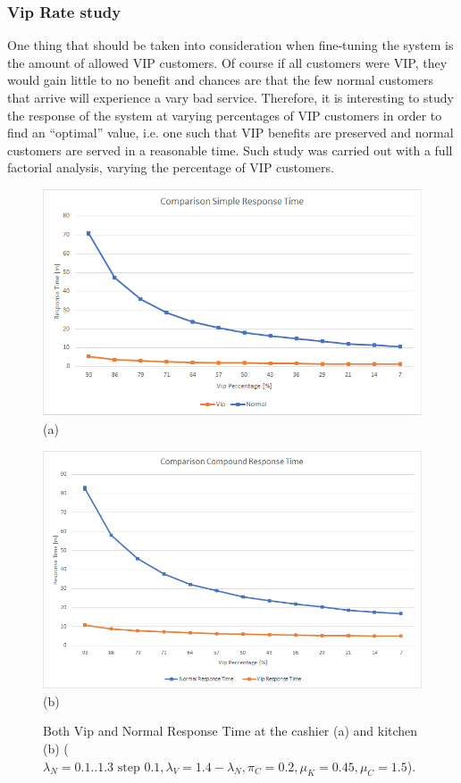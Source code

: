 \subsubsection{Vip Rate study}\label{sec:vip_rate}

One thing that should be taken into consideration when fine-tuning the system is the amount of allowed VIP customers. Of course if all customers were VIP, they would gain little to no benefit and chances are that the few normal customers that arrive will experience a vary bad service. Therefore, it is interesting to study the response of the system at varying percentages of VIP customers in order to find an ``optimal'' value, i.e. one such that VIP benefits are preserved and normal customers are served in a reasonable time. Such study was carried out with a full factorial analysis, varying the percentage of VIP customers.

\begin{figure}[H]
  \begin{minipage}{0.48\textwidth}
    \centering
    \includegraphics[width=\textwidth]{figs/comparisonSimpleResponseTime.png}
    (a)
  \end{minipage}\hspace{0.03\textwidth}
  \begin{minipage}{0.48\textwidth}
    \centering
    \includegraphics[width=\textwidth]{figs/comparisonCompoundResponseTime.png}
    (b)
  \end{minipage}
  \caption{Both Vip and Normal Response Time at the cashier (a) and kitchen (b) ($\lambda_N={{0.1..1.3 \text{ step } 0.1}},\lambda_V=1.4-\lambda_N,\pi_C=0.2, \mu_K=0.45, \mu_C=1.5$).}
  \label{fig:comp_resp_time}
\end{figure}

